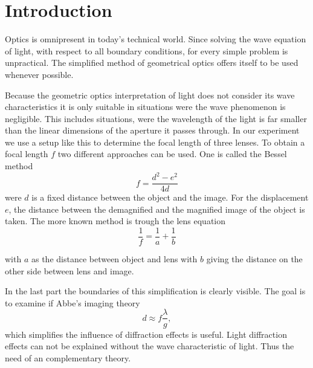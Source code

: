 \section{Introduction}
Optics is omnipresent in today's technical world.
Since solving the wave equation of light, with respect to all boundary conditions, for every simple problem is unpractical.
The simplified method of geometrical optics offers itself to be used whenever possible.

Because the geometric optics interpretation of light does not consider its wave characteristics it is only suitable in situations were the wave phenomenon is negligible.
This includes situations, were the wavelength of the light is far smaller than the linear dimensions of the aperture it passes through. 
In our experiment we use a setup like this to determine the focal length of three lenses. 
To obtain a focal length $f$ two different approaches can be used.
One is called the Bessel method\cite{manual}
\begin{equation}
f = \frac{d^2 - e^2}{4d}
\label{eq::bessel}
\end{equation}
were $d$ is a fixed distance between the object and the image.
For the displacement $e$, the distance between the demagnified and the magnified image of the object is taken.
The more known method is trough the lens equation\cite{manual} 
\begin{equation}
\frac{1}{f} = \frac{1}{a} + \frac{1}{b}
\label{eq::lens}
\end{equation}

with $a$ as the distance between object and lens with $b$ giving the distance on the other side between lens and image.

In the last part the boundaries of this simplification is clearly visible. 
The goal is to examine if Abbe's imaging theory\cite{manual}
\begin{equation}
d \approx f\frac{\lambda}{g},
\label{eq::diff}
\end{equation}
which simplifies the influence of diffraction effects is useful. 
Light diffraction effects can not be explained without the wave characteristic of light.
Thus the need of an complementary theory.
